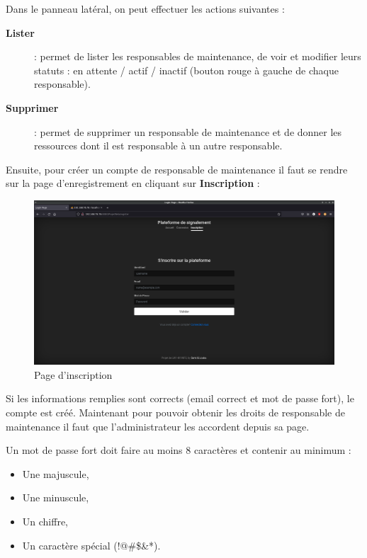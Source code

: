Dans le panneau latéral, on peut effectuer les actions suivantes :
\begin{description}
    \item[\textbf{Lister}] : permet de lister les responsables de maintenance, de voir et modifier
        leurs statuts : en attente / actif / inactif (bouton rouge à gauche de chaque responsable).
    \item[\textbf{Supprimer}] : permet de supprimer un responsable de maintenance et de donner les
        ressources dont il est responsable à un autre responsable.
\end{description}
\newpage

Ensuite, pour créer un compte de responsable de maintenance il faut se rendre sur la page
d'enregistrement en cliquant sur \textbf{Inscription} :
\begin{figure}[!h]
    \centering
    \includegraphics[width=\textwidth]{img/sign-up.png}
    \caption{Page d'inscription}
\end{figure}

Si les informations remplies sont corrects (email correct et mot de passe fort), le compte est
créé. Maintenant pour pouvoir obtenir les droits de responsable de maintenance il faut que
l'administrateur les accordent depuis sa page.

Un mot de passe fort doit faire au moins 8 caractères et contenir au minimum :
\begin{itemize}
    \item Une majuscule,
    \item Une minuscule,
    \item Un chiffre,
    \item Un caractère spécial (!@\#\$\&*).
\end{itemize}
\newpage

